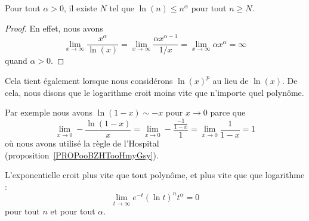 \begin{lemma}   \label{LemSYHKooUiSMFJ}
    Pour tout \( \alpha>0\), il existe \( N\) tel que \( \ln(n)\leq n^{\alpha}\) pour tout \( n\geq N\).
\end{lemma}

\begin{proof}
En effet, nous avons
\begin{equation}
    \lim_{x\to\infty} \frac{ x^{\alpha} }{ \ln(x) }=\lim_{x\to\infty} \frac{ \alpha x^{\alpha-1} }{ 1/x }=\lim_{x\to\infty} \alpha x^{\alpha}=\infty
\end{equation}
quand $\alpha>0$.
\end{proof}
Cela tient également lorsque nous considérons $\ln(x)^p$ au lieu de $\ln(x)$. De cela, nous disons que le logarithme croit moins vite que n'importe quel polynôme.

\begin{example}
    Par exemple nous avons \( \ln(1-x)\sim -x\) pour \( x\to 0\) parce que
    \begin{equation}    \label{EqGICpOX}
        \lim_{x\to 0} -\frac{ \ln(1-x) }{ x }=\lim_{x\to 0} -\frac{ \frac{ -1 }{ 1-x } }{ 1 }=\lim_{x\to 0} \frac{1}{ 1-x }=1
    \end{equation}
    où nous avons utilisé la règle de l'Hospital (proposition~\ref{PROPooBZHTooHmyGsy}).
\end{example}

\begin{lemma}
    L'exponentielle croit plus vite que tout polynôme, et plus vite que que logarithme :
    \begin{equation}        \label{EqExpDecrtPlusVite}
        \lim_{t\to\infty} e^{-t}(\ln t)^{n}t^{\alpha}=0
    \end{equation}
    pour tout $n$ et pour tout $\alpha$.
\end{lemma}

